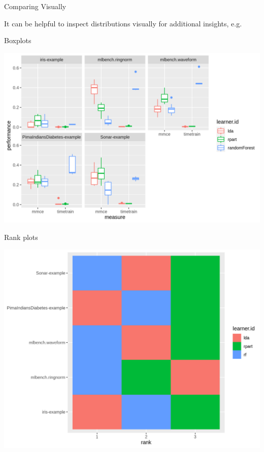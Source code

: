    \begin{frame}[c,allowframebreaks]{Comparing Visually}

    It can be helpful to inspect distributions visually for additional insights,
    e.g.\

    \bigskip
    Boxplots
    \begin{center}
        \includegraphics[height=.65\textheight]{images/multiple-boxplots}
    \end{center}

    \framebreak

    Rank plots
    \begin{center}
        \includegraphics[height=.7\textheight]{images/multiple-ranks}
    \end{center}

    \end{frame}


